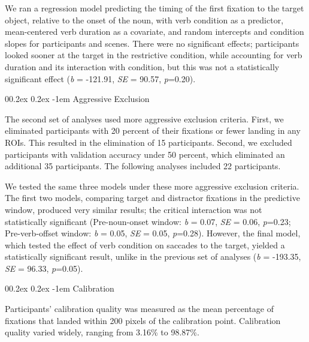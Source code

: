 \documentclass[
  man,floatsintext]{apa6}
\makeatletter
\let\oldparagraph\paragraph
\renewcommand{\paragraph}[1]{\oldparagraph{#1}\mbox{}}
\renewcommand{\paragraph}{\@startsection{paragraph}{4}{\parindent}%
  {0\baselineskip \@plus 0.2ex \@minus 0.2ex}%
  {-1em}%
  {\normalfont\normalsize\bfseries\itshape\typesectitle}}
\makeatother
\begin{document}
We ran a regression model predicting the timing of the first fixation to the target object, relative to the onset of the noun, with verb condition as a predictor, mean-centered verb duration as a covariate, and random intercepts and condition slopes for participants and scenes. There were no significant effects; participants looked sooner at the target in the restrictive condition, while accounting for verb duration and its interaction with condition, but this was not a statistically significant effect (\emph{b} = -121.91, \emph{SE} = 90.57, \emph{p}=0.20).

\paragraph{Aggressive Exclusion}\label{aggressive-exclusion}

The second set of analyses used more aggressive exclusion criteria. First, we eliminated participants with 20 percent of their fixations or fewer landing in any ROIs. This resulted in the elimination of 15 participants. Second, we excluded participants with validation accuracy under 50 percent, which eliminated an additional 35 participants. The following analyses included 22 participants.

We tested the same three models under these more aggressive exclusion criteria. The first two models, comparing target and distractor fixations in the predictive window, produced very similar results; the critical interaction was not statistically significant (Pre-noun-onset window: \emph{b} = 0.07, \emph{SE} = 0.06, \emph{p}=0.23; Pre-verb-offset window: \emph{b} = 0.05, \emph{SE} = 0.05, \emph{p}=0.28). However, the final model, which tested the effect of verb condition on saccades to the target, yielded a statistically significant result, unlike in the previous set of analyses (\emph{b} = -193.35, \emph{SE} = 96.33, \emph{p}=0.05).

\paragraph{Calibration}\label{calibration}

Participants' calibration quality was measured as the mean percentage of fixations that landed within 200 pixels of the calibration point. Calibration quality varied widely, ranging from 3.16\% to 98.87\%.
\end{document}
